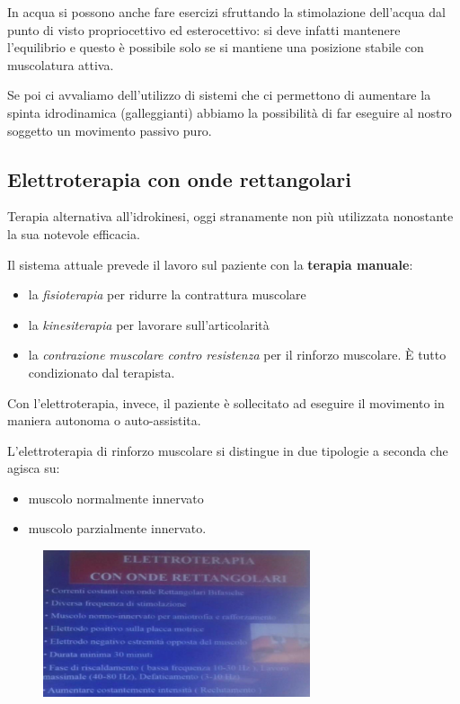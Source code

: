 In acqua si possono anche fare esercizi sfruttando la stimolazione
dell'acqua dal punto di visto propriocettivo ed esterocettivo: si deve
infatti mantenere l'equilibrio e questo è possibile solo se si mantiene
una posizione stabile con muscolatura attiva.

Se poi ci avvaliamo dell'utilizzo di sistemi che ci permettono di
aumentare la spinta idrodinamica (galleggianti) abbiamo la possibilità
di far eseguire al nostro soggetto un movimento passivo puro.

\subsection{Elettroterapia con onde rettangolari}

Terapia alternativa all'idrokinesi, oggi stranamente non più utilizzata
nonostante la sua notevole efficacia.


Il sistema attuale prevede il lavoro sul paziente con la \textbf{terapia
manuale}:


\begin{itemize}
\item
  
  la \emph{fisioterapia} per ridurre la contrattura muscolare
  
\item
  
  la \emph{kinesiterapia} per lavorare sull'articolarità
  
\item
  
  la \emph{contrazione muscolare contro resistenza} per il rinforzo
  muscolare. È tutto condizionato dal terapista.
  
\end{itemize}

Con l'elettroterapia, invece, il paziente è sollecitato ad eseguire il
movimento in maniera autonoma o auto-assistita.


L'elettroterapia di rinforzo muscolare si distingue in due tipologie a
seconda che agisca su:


\begin{itemize}
\item
  muscolo normalmente innervato
\item
  muscolo parzialmente innervato.
\end{itemize}

\begin{figure}[!ht]
\centering
	\includegraphics[width=0.7\textwidth]{031/image1.jpeg}
\end{figure}


